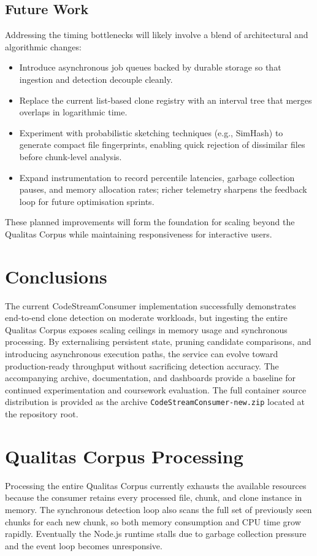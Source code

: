 \documentclass[11pt]{article}
\begin{document}
\subsection*{Future Work}
Addressing the timing bottlenecks will likely involve a blend of architectural and algorithmic changes:
\begin{itemize}
  \item Introduce asynchronous job queues backed by durable storage so that ingestion and detection decouple cleanly.
  \item Replace the current list-based clone registry with an interval tree that merges overlaps in logarithmic time.
  \item Experiment with probabilistic sketching techniques (e.g., SimHash) to generate compact file fingerprints, enabling quick rejection of dissimilar files before chunk-level analysis.
  \item Expand instrumentation to record percentile latencies, garbage collection pauses, and memory allocation rates; richer telemetry sharpens the feedback loop for future optimisation sprints.
\end{itemize}
These planned improvements will form the foundation for scaling beyond the Qualitas Corpus while maintaining responsiveness for interactive users.

\section*{Conclusions}
The current CodeStreamConsumer implementation successfully demonstrates end-to-end clone detection on moderate workloads, but ingesting the entire Qualitas Corpus exposes scaling ceilings in memory usage and synchronous processing.
By externalising persistent state, pruning candidate comparisons, and introducing asynchronous execution paths, the service can evolve toward production-ready throughput without sacrificing detection accuracy.
The accompanying archive, documentation, and dashboards provide a baseline for continued experimentation and coursework evaluation.
The full container source distribution is provided as the archive \texttt{CodeStreamConsumer-new.zip} located at the repository root.

\section*{Qualitas Corpus Processing}
Processing the entire Qualitas Corpus currently exhausts the available resources because the consumer retains every processed file, chunk, and clone instance in memory. The synchronous detection loop also scans the full set of previously seen chunks for each new chunk, so both memory consumption and CPU time grow rapidly. Eventually the Node.js runtime stalls due to garbage collection pressure and the event loop becomes unresponsive.
\end{document}
